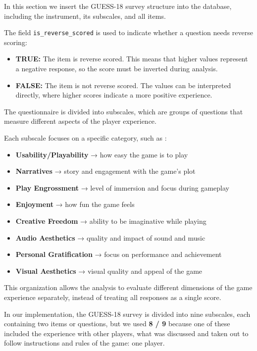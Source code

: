 \documentclass[11pt]{article}
\begin{document}
In this section we insert the GUESS-18 survey structure into the database, including the instrument, its subscales, and all items.

\medskip

The field \texttt{is\_reverse\_scored} is used to indicate whether a question needs reverse scoring:

\medskip
\begin{itemize}
    \item \textbf{TRUE:} The item is reverse scored. This means that higher values represent a negative response, so the score must be inverted during analysis.

\medskip

    \item \textbf{FALSE:} The item is not reverse scored. The values can be interpreted directly, where higher scores indicate a more positive experience.

\end{itemize}


The questionnaire is divided into subscales, which are groups of questions that measure different aspects of the player experience.

Each subscale focuses on a specific category, such as :
\begin{itemize}
    \item \textbf{Usability/Playability} → how easy the game is to play
    \item \textbf{Narratives} → story and engagement with the game's plot
    \item \textbf{Play Engrossment} → level of immersion and focus during gameplay
    \item \textbf{Enjoyment} → how fun the game feels
    \item \textbf{Creative Freedom} → ability to be imaginative while playing
    \item \textbf{Audio Aesthetics} → quality and impact of sound and music
    \item \textbf{Personal Gratification} → focus on performance and achievement
    \item \textbf{Visual Aesthetics} → visual quality and appeal of the game
\end{itemize}

This organization allows the analysis to evaluate different dimensions of the game experience separately, instead of treating all responses as a single score.

In our implementation, the GUESS-18 survey is divided into nine subscales, each containing two items or questions, but we used \textbf{8 / 9} because one of these included the experience with other players, what was discussed and taken out to follow instructions and rules of the game: one player.
\end{document}
